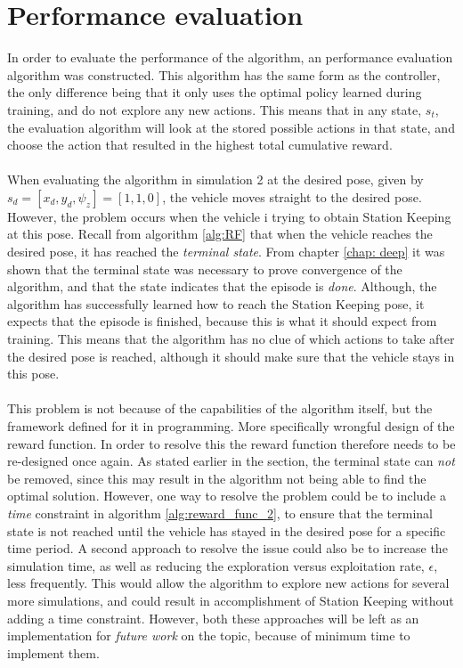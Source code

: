 \section{Performance evaluation}
In order to evaluate the performance of the algorithm, an performance evaluation algorithm was constructed. This algorithm has the same form as the controller, the only difference being that it only uses the optimal policy learned during training, and do not explore any new actions. This means that in any state, $s_{t}$, the evaluation algorithm will look at the stored possible actions in that state, and choose the action that resulted in the highest total cumulative reward.\\\\
When evaluating the algorithm in simulation 2 at the desired pose, given by $s_{d}=[x_{d},y_{d},\psi_{z}]=[1,1,0]$, the vehicle moves straight to the desired pose. However, the problem occurs when the vehicle i trying to obtain Station Keeping at this pose. Recall from algorithm \ref{alg:RF} that when the vehicle reaches the desired pose, it has reached the \textit{terminal state}. From chapter \ref{chap: deep} it was shown that the terminal state was necessary to prove convergence of the algorithm, and that the state indicates that the episode is \textit{done}. Although, the algorithm has successfully learned how to reach the Station Keeping pose, it expects that the episode is finished, because this is what it should expect from training. This means that the algorithm has no clue of which actions to take after the desired pose is reached, although it should make sure that the vehicle stays in this pose.\\\\
This problem is not because of the capabilities of the algorithm itself, but the framework defined for it in programming. More specifically wrongful design of the reward function. In order to resolve this the reward function therefore needs to be re-designed once again. As stated earlier in the section, the terminal state can \textit{not} be removed, since this may result in the algorithm not being able to find the optimal solution. However, one way to resolve the problem could be to include a \textit{time} constraint in algorithm \ref{alg:reward_func_2}, to ensure that the terminal state is not reached until the vehicle has stayed in the desired pose for a specific time period. A second approach to resolve the issue could also be to increase the simulation time, as well as reducing the exploration versus exploitation rate, $\epsilon$, less frequently. This would allow the algorithm to explore new actions for several more simulations, and could result in accomplishment of Station Keeping without adding a time constraint. However, both these approaches will be left as an implementation for \textit{future work} on the topic, because of minimum time to implement them. 